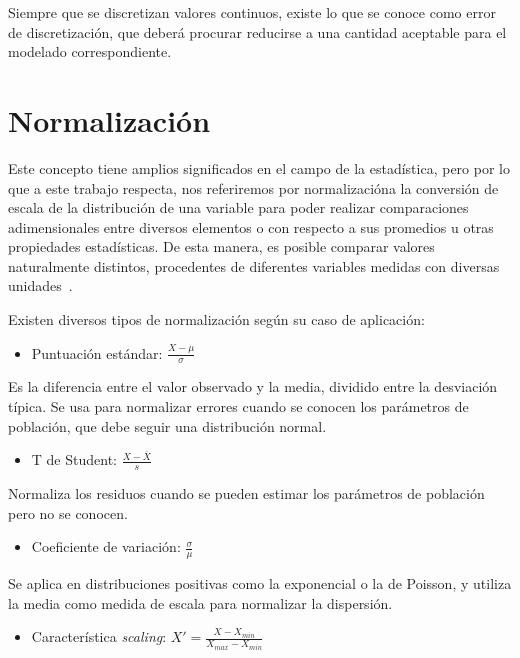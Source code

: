 Siempre que se discretizan valores continuos, existe lo que se conoce como error de discretización, que deberá procurar reducirse a una cantidad aceptable para el modelado correspondiente.

\section{Normalización}

Este concepto tiene amplios significados en el campo de la estadística, pero por lo que a este trabajo respecta, nos referiremos por \guillemotleft normalización\guillemotright\space a la conversión de escala de la distribución de una variable para poder realizar comparaciones adimensionales entre diversos elementos o con respecto a sus promedios u otras propiedades estadísticas. De esta manera, es posible comparar valores naturalmente distintos, procedentes de diferentes variables medidas con diversas unidades~\cite{normalizacion, normalizacion2}.

Existen diversos tipos de normalización según su caso de aplicación:

\begin{itemize}
    \item Puntuación estándar: $\frac{X - \mu}{\sigma}$
\end{itemize}

Es  la diferencia entre el valor observado y la media, dividido entre la desviación típica. Se usa para normalizar errores cuando se conocen los parámetros de población, que debe seguir una distribución normal.

\begin{itemize}
    \item T de Student: $\frac{X - \overline{X}}{s}$
\end{itemize}

Normaliza los residuos cuando se pueden estimar los parámetros de población pero no se conocen.

\begin{itemize}
    \item Coeficiente de variación: $\frac{\sigma}{\mu}$
\end{itemize}

Se aplica en distribuciones positivas como la exponencial o la de Poisson, y utiliza la media como medida de escala para normalizar la dispersión.

\begin{itemize}
    \item Característica \textit{scaling}: $X' = \frac{X - X_{min}}{X_{max}-X_{min}}$
\end{itemize}

